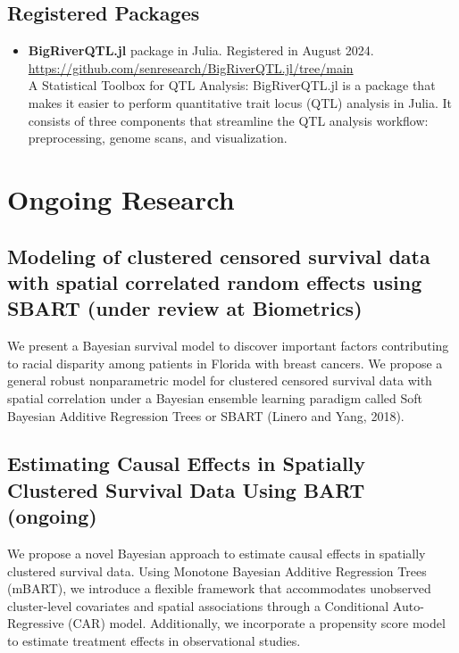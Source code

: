 \documentclass[11pt,a4paper]{article}
\begin{document}
\subsection{Registered Packages}
\begin{itemize}[leftmargin=*]
  \item \textbf{BigRiverQTL.jl} package in Julia. Registered in August 2024.\\
  \url{https://github.com/senresearch/BigRiverQTL.jl/tree/main}\\
  A Statistical Toolbox for QTL Analysis: BigRiverQTL.jl is a package that makes it easier to perform quantitative trait locus (QTL) analysis in Julia. It consists of three components that streamline the QTL analysis workflow: preprocessing, genome scans, and visualization.
\end{itemize}

\section{Ongoing Research}

\subsection{Modeling of clustered censored survival data with spatial correlated random effects using SBART (under review at Biometrics)}
We present a Bayesian survival model to discover important factors contributing to racial disparity among patients in Florida with breast cancers. We propose a general robust nonparametric model for clustered censored survival data with spatial correlation under a Bayesian ensemble learning paradigm called Soft Bayesian Additive Regression Trees or SBART (Linero and Yang, 2018).

\subsection{Estimating Causal Effects in Spatially Clustered Survival Data Using BART (ongoing)}
We propose a novel Bayesian approach to estimate causal effects in spatially clustered survival data. Using Monotone Bayesian Additive Regression Trees (mBART), we introduce a flexible framework that accommodates unobserved cluster-level covariates and spatial associations through a Conditional Auto-Regressive (CAR) model. Additionally, we incorporate a propensity score model to estimate treatment effects in observational studies.
\end{document}

